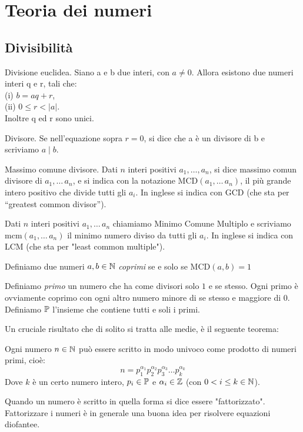 \documentclass[11pt]{scrartcl}
\begin{document}
	\section{Teoria dei numeri}
	\subsection{Divisibilità}
	\begin{definition}
		Divisione euclidea. Siano a e b due interi, con $a \neq 0$. Allora esistono due numeri interi q e r, tali che:\\
		(i) $b = aq + r$, \\
		(ii) $ 0 \le r < |a|$. \\
		Inoltre q ed r sono unici.
		\\
	\end{definition}
	\begin{definition}
		Divisore. Se nell'equazione sopra $r = 0$, si dice che a è un divisore di b e scriviamo $a \mid b$.
	\end{definition}
	\begin{definition}
		Massimo comune divisore. Dati $n$ interi positivi $a_1,\dots, a_n$, si dice massimo
		comun divisore di $a_1,\dots\, a_n$, e si indica con la notazione
		$\text{MCD}(a_1,\dots\, a_n)$, il più grande intero positivo che divide tutti gli $a_i$. In inglese si indica con GCD (che sta per “greatest common divisor”).
	\end{definition} 
	\begin{definition}
		Dati $n$ interi positivi $a_1,\dots\,a_n$ chiamiamo Minimo Comune Multiplo e scriviamo $\text{mcm}(a_1,\dots\,a_n)$ il minimo numero diviso da tutti gli $a_i$. In inglese si indica con LCM (che sta per "least common multiple").
	\end{definition}
	\begin{definition}
		Definiamo due numeri $a,b \in \mathbb N$ \textit{coprimi} se e solo se $\text{MCD}(a,b)=1$
	\end{definition}
	\begin{definition}
		Definiamo \textit{primo} un numero che ha come divisori solo $1$ e se stesso. Ogni primo è ovviamente coprimo con ogni altro numero minore di se stesso e maggiore di $0$. Definiamo $\mathbb P$ l'insieme che contiene tutti e soli i primi.
	\end{definition}
	
	Un cruciale risultato che di solito si tratta alle medie, è il seguente teorema:
	\begin{theorem}
		Ogni numero $n\in\mathbb N$ può essere scritto in modo univoco come prodotto di numeri primi, cioè:
		$$n=p_1^{\alpha_1}p_2^{\alpha_2}p_3^{\alpha_3}\dots p_k^{\alpha_k}$$
		Dove $k$ è un certo numero intero, $p_i\in \mathbb P$ e $\alpha_i\in \mathbb Z$ (con $0<i\le k \in \mathbb N$). 
	\end{theorem}
	Quando un numero è scritto in quella forma si dice essere "fattorizzato". Fattorizzare i numeri è in generale una buona idea per risolvere equazioni diofantee.
	
\end{document}
